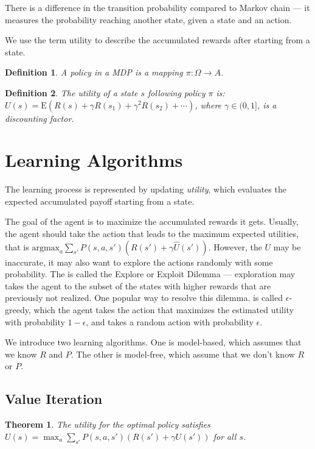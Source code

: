 \documentclass[10pt]{article}
\newtheorem{definition}{Definition}
\newtheorem{theorem}{Theorem}
\newcommand{\E}{\mathrm{E}}
\begin{document}
There is a difference in the transition probability compared to Markov chain ---
it measures the probability reaching another state, given a state and an action.

We use the term utility to describe the accumulated rewards after starting from
a state.

\begin{definition}
A policy in a MDP is a mapping $\pi: \Omega \rightarrow A$.
\end{definition}

\begin{definition}
The utility of a state $s$ following policy $\pi$ is: $U(s) = \E (R(s) + \gamma
R(s_1) + \gamma^2 R(s_2) + \cdots)$, where $\gamma \in (0, 1]$, is a discounting
factor.
\end{definition}

\section{Learning Algorithms}
\label{sec:dm}

The learning process is represented by updating {\em utility}, which evaluates
the expected accumulated payoff starting from a state. 

The goal of the agent is to maximize the accumulated rewards it gets. Usually, the agent should take the action that leads to the maximum expected
utilities, that is ${\mathrm{argmax}}_a \sum_{s'} P(s, a, s') (R(s') + \gamma
\hat{U}(s'))$.  However, the
$U$ may be inaccurate, it may also want to explore the actions randomly with
some probability. The is called the Explore or Exploit Dilemma --- exploration
may takes the agent to the subset of the states with higher rewards that are
previously not realized. One popular way to resolve this dilemma. is called $\epsilon$-greedy, which the agent
takes the action that maximizes the estimated utility with probability $1 -
\epsilon$, and takes a random action with probability $\epsilon$.

We introduce two learning algorithms. One is model-based, which assumes that we
know $R$ and $P$. The other is model-free, which assume that we don't know $R$
or $P$.

\subsection{Value Iteration}

\begin{theorem}
The utility for the optimal policy satisfies $U(s) = \max_a \sum_{s'} P(s, a,
s') (R(s') + \gamma U(s'))$ for all $s$.
\cite{rl}
\end{theorem}
\end{document}
